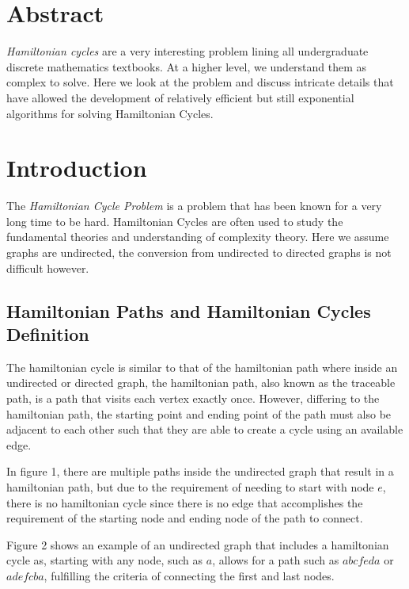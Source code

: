 \newpage

\section{Abstract}

\emph{Hamiltonian cycles} are a very interesting problem lining all
undergraduate discrete mathematics textbooks. At a higher level, we understand
them as complex to solve. Here we look at the problem and discuss intricate
details that have allowed the development of relatively efficient but still
exponential algorithms for solving Hamiltonian Cycles.

\section{Introduction}

The \emph{Hamiltonian Cycle Problem} is a problem that has been known for a very
long time to be hard. Hamiltonian Cycles are often used to study the fundamental
theories and understanding of complexity theory. Here we assume graphs are
undirected, the conversion from undirected to directed graphs is not difficult
however.

\subsection{Hamiltonian Paths and Hamiltonian Cycles Definition}

The hamiltonian cycle is similar to that of the hamiltonian path where inside an
undirected or directed graph, the hamiltonian path, also known as the traceable
path, is a path that visits each vertex exactly once. However, differing to the
hamiltonian path, the starting point and ending point of the path must also be
adjacent to each other such that they are able to create a cycle using an
available edge.

In figure 1, there are multiple paths inside the undirected graph that result in
a hamiltonian path, but due to the requirement of needing to start with node
$e$, there is no hamiltonian cycle since there is no edge that accomplishes the
requirement of the starting node and ending node of the path to connect.

Figure 2 shows an example of an undirected graph that includes a hamiltonian
cycle as, starting with any node, such as $a$, allows for a path such as
$abcfeda$ or $adefcba$, fulfilling the criteria of connecting the first and last
nodes.

